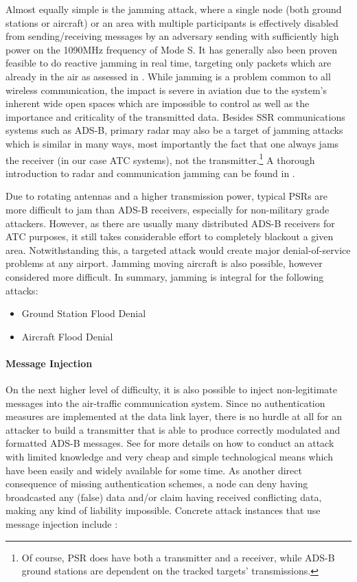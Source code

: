 \documentclass[english]{IEEEtran}
\begin{document}
Almost equally simple is the jamming attack, where a single node (both
ground stations or aircraft) or an area with multiple participants
is effectively disabled from sending/receiving messages by an adversary
sending with sufficiently high power on the 1090MHz frequency of Mode
S. It has generally also been proven feasible to do reactive jamming
in real time, targeting only packets which are already in the air
as assessed in \cite{Wilhelm2011a}. While jamming is a problem common
to all wireless communication, the impact is severe in aviation due
to the system's inherent wide open spaces which are impossible to
control as well as the importance and criticality of the transmitted
data. Besides SSR communications systems such as ADS-B, primary radar
may also be a target of jamming attacks which is similar in many ways,
most importantly the fact that one always jams the receiver (in our
case ATC systems), not the transmitter.\footnote{Of course, PSR does have both a transmitter and a receiver, while
ADS-B ground stations are dependent on the tracked targets' transmissions.} A thorough introduction to radar and communication jamming can be
found in \cite{adamy2001ew}.

Due to rotating antennas and a higher transmission power, typical
PSRs are more difficult to jam than ADS-B receivers, especially for
non-military grade attackers. However, as there are usually many distributed
ADS-B receivers for ATC purposes, it still takes considerable effort
to completely blackout a given area. Notwithstanding this, a targeted
attack would create major denial-of-service problems at any airport.
Jamming moving aircraft is also possible, however considered more
difficult. In summary, jamming is integral for the following attacks\cite{McCallie2011}:

\vspace{+0.1in}
\begin{itemize}
\item Ground Station Flood Denial
\item Aircraft Flood Denial\\

\end{itemize}

\paragraph*{Message Injection}

On the next higher level of difficulty, it is also possible to inject
non-legitimate messages\emph{ }into the air-traffic communication
system. Since no authentication measures are implemented at the data
link layer, there is no hurdle at all for an attacker to build a transmitter
that is able to produce correctly modulated and formatted ADS-B messages.
See \cite{schafer2013experimental} for more details on how to conduct
an attack with limited knowledge and very cheap and simple technological
means which have been easily and widely available for some time. As
another direct consequence of missing authentication schemes, a node
can deny having broadcasted any (false) data and/or claim having received
conflicting data, making any kind of liability impossible. Concrete
attack instances that use message injection include \cite{McCallie2011}:
\end{document}
